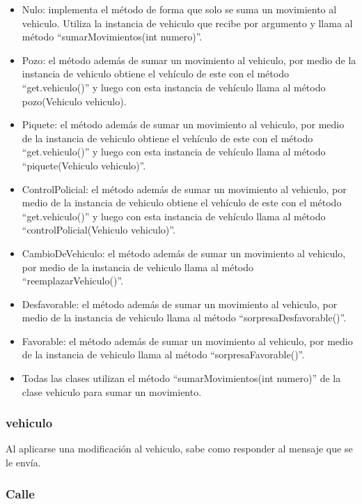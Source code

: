 \documentclass[titlepage,a4paper]{article}
\begin{document}
\begin{itemize}
  \item Nulo: implementa el método de forma que solo se suma un movimiento al vehiculo. Utiliza la instancia de vehiculo que recibe por argumento y llama al método “sumarMovimientos(int numero)”. 
  \item Pozo: el método además de sumar un movimiento al vehiculo, por medio de la instancia de vehiculo obtiene el vehículo de este con el método “get.vehiculo()” y luego con esta instancia de vehículo llama al método pozo(Vehiculo vehiculo). 
  \item Piquete: el método además de sumar un movimiento al vehiculo, por medio de la instancia de vehiculo obtiene el vehículo de este con el método “get.vehiculo()” y luego con esta instancia de vehículo llama al método “piquete(Vehiculo vehiculo)”. 
  \item ControlPolicial: el método además de sumar un movimiento al vehiculo, por medio de la instancia de vehiculo obtiene el vehículo de este con el método “get.vehiculo()” y luego con esta instancia de vehículo llama al método “controlPolicial(Vehiculo vehiculo)”. 
  \item CambioDeVehiculo: el método además de sumar un movimiento al vehiculo, por medio de la instancia de vehiculo llama al método “reemplazarVehiculo()”.
  \item Desfavorable: el método además de sumar un movimiento al vehiculo, por medio de la instancia de vehiculo llama al método “sorpresaDesfavorable()”.
  \item Favorable: el método además de sumar un movimiento al vehiculo, por medio de la instancia de vehiculo llama al método “sorpresaFavorable()”.
  \item Todas las clases utilizan el método “sumarMovimientos(int numero)” de la clase vehiculo para sumar un movimiento. 
\end{itemize}

\subsubsection[vehiculo]{vehiculo}

Al aplicarse una modificación al vehiculo, sabe como responder al mensaje que se le envía.


\subsubsection[Calle]{Calle}
\end{document}
